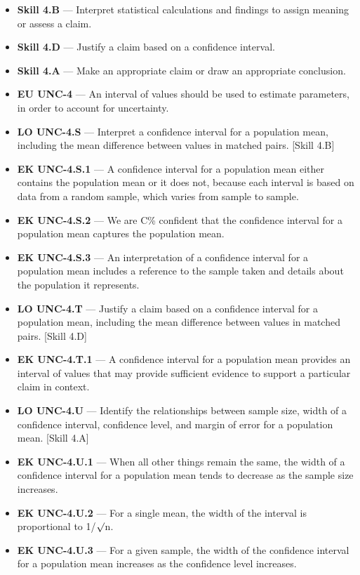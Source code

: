 \documentclass[11pt]{article}
\begin{document}


{\small
\begin{itemize}[leftmargin=1.5em,itemsep=2pt,topsep=2pt]
  \item \textbf{Skill 4.B} --- Interpret statistical calculations and findings to assign meaning or assess a claim.
  \item \textbf{Skill 4.D} --- Justify a claim based on a confidence interval.
  \item \textbf{Skill 4.A} --- Make an appropriate claim or draw an appropriate conclusion.
  \item \textbf{EU UNC-4} --- An interval of values should be used to estimate parameters, in order to account for uncertainty.
  \item \textbf{LO UNC-4.S} --- Interpret a confidence interval for a population mean, including the mean difference between values in matched pairs. [Skill 4.B]
  \item \textbf{EK UNC-4.S.1} --- A confidence interval for a population mean either contains the population mean or it does not, because each interval is based on data from a random sample, which varies from sample to sample.
  \item \textbf{EK UNC-4.S.2} --- We are C\% confident that the confidence interval for a population mean captures the population mean.
  \item \textbf{EK UNC-4.S.3} --- An interpretation of a confidence interval for a population mean includes a reference to the sample taken and details about the population it represents.
  \item \textbf{LO UNC-4.T} --- Justify a claim based on a confidence interval for a population mean, including the mean difference between values in matched pairs. [Skill 4.D]
  \item \textbf{EK UNC-4.T.1} --- A confidence interval for a population mean provides an interval of values that may provide sufficient evidence to support a particular claim in context.
  \item \textbf{LO UNC-4.U} --- Identify the relationships between sample size, width of a confidence interval, confidence level, and margin of error for a population mean. [Skill 4.A]
  \item \textbf{EK UNC-4.U.1} --- When all other things remain the same, the width of a confidence interval for a population mean tends to decrease as the sample size increases.
  \item \textbf{EK UNC-4.U.2} --- For a single mean, the width of the interval is proportional to 1/$\surd$n.
  \item \textbf{EK UNC-4.U.3} --- For a given sample, the width of the confidence interval for a population mean increases as the confidence level increases.
\end{itemize}
}
\end{document}

